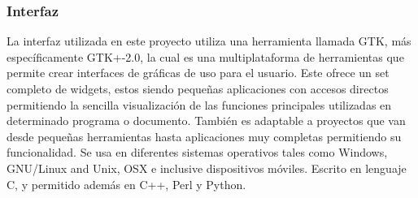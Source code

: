 \subsubsection{Interfaz}
La interfaz utilizada en este proyecto utiliza una herramienta llamada GTK, más específicamente GTK+-2.0, la cual es una multiplataforma de herramientas que permite crear interfaces de gráficas de uso para el usuario. Este ofrece un set completo de widgets, estos siendo pequeñas aplicaciones con accesos directos permitiendo la sencilla visualización de las funciones principales utilizadas en determinado programa o documento. También es adaptable a proyectos que van desde pequeñas herramientas hasta aplicaciones muy completas permitiendo su funcionalidad. Se usa en diferentes sistemas operativos tales como Windows, GNU/Linux and Unix, OSX e inclusive dispositivos móviles. Escrito en lenguaje C, y permitido además en C++, Perl y Python. \cite{interfaz}
